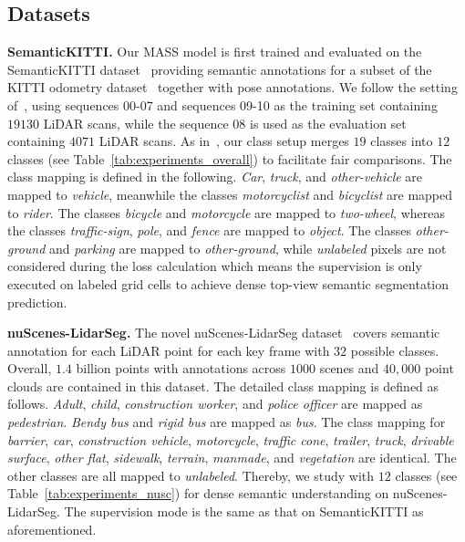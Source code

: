 \documentclass[lettersize,journal]{IEEEtran}
\begin{document}
\subsection{Datasets}
\textbf{SemanticKITTI.}
Our MASS model is first trained and evaluated on the SemanticKITTI dataset~\cite{semantic_kitti} providing semantic annotations for a subset of the KITTI odometry dataset~\cite{kitti} together with pose annotations.
We follow the setting of~\cite{semantic_kitti}, using sequences 00-07 and sequences 09-10  as the training set containing $19130$ LiDAR scans, while the sequence 08 is used as the evaluation set containing $4071$ LiDAR scans.
As in~\cite{bieder2020exploiting}, our class setup merges $19$ classes into $12$ classes (see Table~\ref{tab:experiments_overall}) to facilitate fair comparisons. The class mapping is defined in the following.
\emph{Car}, \emph{truck}, and \emph{other-vehicle} are mapped to \emph{vehicle}, meanwhile the classes \emph{motorcyclist} and \emph{bicyclist} are mapped to \emph{rider}.
The classes \emph{bicycle} and \emph{motorcycle} are mapped to \emph{two-wheel}, whereas the classes \emph{traffic-sign}, \emph{pole}, and \emph{fence} are mapped to \emph{object}.
The classes \emph{other-ground} and \emph{parking} are mapped to \emph{other-ground}, while \emph{unlabeled} pixels are not considered during the loss calculation which means the supervision is only executed on labeled grid cells to achieve dense top-view semantic segmentation prediction.

\textbf{nuScenes-LidarSeg.} The novel nuScenes-LidarSeg dataset~\cite{nuscenes} covers semantic annotation for each LiDAR point for each key frame with $32$ possible classes.
Overall, $1.4$ billion points with annotations across $1000$ scenes and $40,000$ point clouds are contained in this dataset.
The detailed class mapping is defined as follows. \emph{Adult}, \emph{child}, \emph{construction worker}, and \emph{police officer} are mapped as \emph{pedestrian}.
\emph{Bendy bus} and \emph{rigid bus} are mapped as \emph{bus}. The class mapping for \emph{barrier}, \emph{car}, \emph{construction vehicle}, \emph{motorcycle}, \emph{traffic cone}, \emph{trailer}, \emph{truck}, \emph{drivable surface}, \emph{other flat}, \emph{sidewalk}, \emph{terrain}, \emph{manmade}, and \emph{vegetation} are identical.
The other classes are all mapped to \emph{unlabeled}.
Thereby, we study with $12$ classes (see Table~\ref{tab:experiments_nusc}) for dense semantic understanding on nuScenes-LidarSeg.
The supervision mode is the same as that on SemanticKITTI as aforementioned. 
\end{document}
